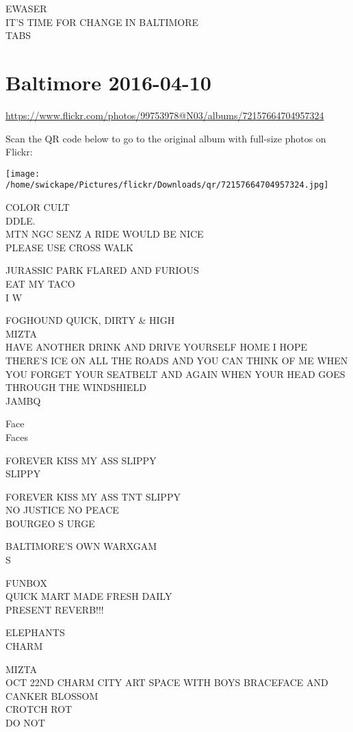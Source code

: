 \documentclass[10pt,letterpaper]{article}
\begin{document}
EWASER\\
IT'S TIME FOR CHANGE IN BALTIMORE\\
TABS
\pagebreak

\section*{Baltimore 2016-04-10}

\url{https://www.flickr.com/photos/99753978@N03/albums/72157664704957324}

Scan the QR code below to go to the original album with full-size photos on Flickr:

\texttt{[image: /home/swickape/Pictures/flickr/Downloads/qr/72157664704957324.jpg]}
\pagebreak

COLOR CULT\\
DDLE.\\
MTN NGC SENZ A RIDE WOULD BE NICE\\
PLEASE USE CROSS WALK

JURASSIC PARK FLARED AND FURIOUS\\
EAT MY TACO\\
I W

FOGHOUND QUICK, DIRTY \& HIGH\\
MIZTA\\
HAVE ANOTHER DRINK AND DRIVE YOURSELF HOME I HOPE THERE'S ICE ON ALL THE ROADS AND YOU CAN THINK OF ME WHEN YOU FORGET YOUR SEATBELT AND AGAIN WHEN YOUR HEAD GOES THROUGH THE WINDSHIELD\\
JAMBQ

Face\\
Faces

FOREVER KISS MY ASS SLIPPY\\
SLIPPY

FOREVER KISS MY ASS TNT SLIPPY\\
NO JUSTICE NO PEACE\\
BOURGEO S URGE

BALTIMORE'S OWN WARXGAM\\
S

FUNBOX\\
QUICK MART MADE FRESH DAILY\\
PRESENT REVERB!!!

ELEPHANTS\\
CHARM

MIZTA\\
OCT 22ND CHARM CITY ART SPACE WITH BOYS BRACEFACE AND CANKER BLOSSOM\\
CROTCH ROT\\
DO NOT
\end{document}
